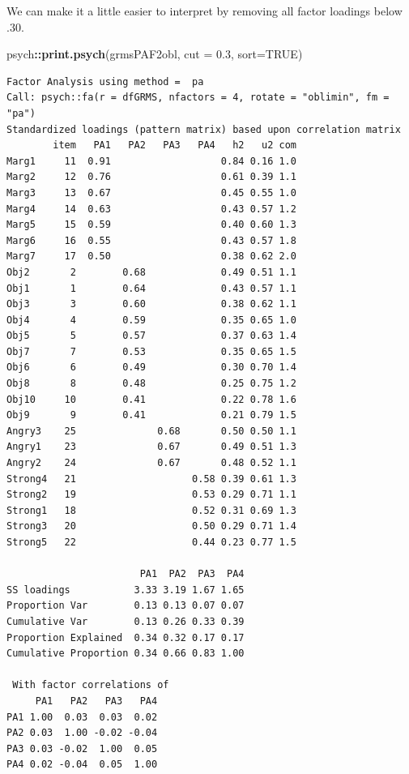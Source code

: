 \documentclass[
  english,
]{book}
\newenvironment{Shaded}{\begin{snugshade}}{\end{snugshade}}
\newcommand{\DataTypeTok}[1]{\textcolor[rgb]{0.13,0.29,0.53}{#1}}
\newcommand{\FloatTok}[1]{\textcolor[rgb]{0.00,0.00,0.81}{#1}}
\newcommand{\KeywordTok}[1]{\textcolor[rgb]{0.13,0.29,0.53}{\textbf{#1}}}
\newcommand{\NormalTok}[1]{#1}
\newcommand{\OperatorTok}[1]{\textcolor[rgb]{0.81,0.36,0.00}{\textbf{#1}}}
\newcommand{\OtherTok}[1]{\textcolor[rgb]{0.56,0.35,0.01}{#1}}
\begin{document}
We can make it a little easier to interpret by removing all factor loadings below .30.

\begin{Shaded}
\begin{Highlighting}[]
\NormalTok{psych}\OperatorTok{::}\KeywordTok{print.psych}\NormalTok{(grmsPAF2obl, }\DataTypeTok{cut =} \FloatTok{0.3}\NormalTok{, }\DataTypeTok{sort=}\OtherTok{TRUE}\NormalTok{)}
\end{Highlighting}
\end{Shaded}

\begin{verbatim}
Factor Analysis using method =  pa
Call: psych::fa(r = dfGRMS, nfactors = 4, rotate = "oblimin", fm = "pa")
Standardized loadings (pattern matrix) based upon correlation matrix
        item   PA1   PA2   PA3   PA4   h2   u2 com
Marg1     11  0.91                   0.84 0.16 1.0
Marg2     12  0.76                   0.61 0.39 1.1
Marg3     13  0.67                   0.45 0.55 1.0
Marg4     14  0.63                   0.43 0.57 1.2
Marg5     15  0.59                   0.40 0.60 1.3
Marg6     16  0.55                   0.43 0.57 1.8
Marg7     17  0.50                   0.38 0.62 2.0
Obj2       2        0.68             0.49 0.51 1.1
Obj1       1        0.64             0.43 0.57 1.1
Obj3       3        0.60             0.38 0.62 1.1
Obj4       4        0.59             0.35 0.65 1.0
Obj5       5        0.57             0.37 0.63 1.4
Obj7       7        0.53             0.35 0.65 1.5
Obj6       6        0.49             0.30 0.70 1.4
Obj8       8        0.48             0.25 0.75 1.2
Obj10     10        0.41             0.22 0.78 1.6
Obj9       9        0.41             0.21 0.79 1.5
Angry3    25              0.68       0.50 0.50 1.1
Angry1    23              0.67       0.49 0.51 1.3
Angry2    24              0.67       0.48 0.52 1.1
Strong4   21                    0.58 0.39 0.61 1.3
Strong2   19                    0.53 0.29 0.71 1.1
Strong1   18                    0.52 0.31 0.69 1.3
Strong3   20                    0.50 0.29 0.71 1.4
Strong5   22                    0.44 0.23 0.77 1.5

                       PA1  PA2  PA3  PA4
SS loadings           3.33 3.19 1.67 1.65
Proportion Var        0.13 0.13 0.07 0.07
Cumulative Var        0.13 0.26 0.33 0.39
Proportion Explained  0.34 0.32 0.17 0.17
Cumulative Proportion 0.34 0.66 0.83 1.00

 With factor correlations of 
     PA1   PA2   PA3   PA4
PA1 1.00  0.03  0.03  0.02
PA2 0.03  1.00 -0.02 -0.04
PA3 0.03 -0.02  1.00  0.05
PA4 0.02 -0.04  0.05  1.00


\end{verbatim}
\end{document}

